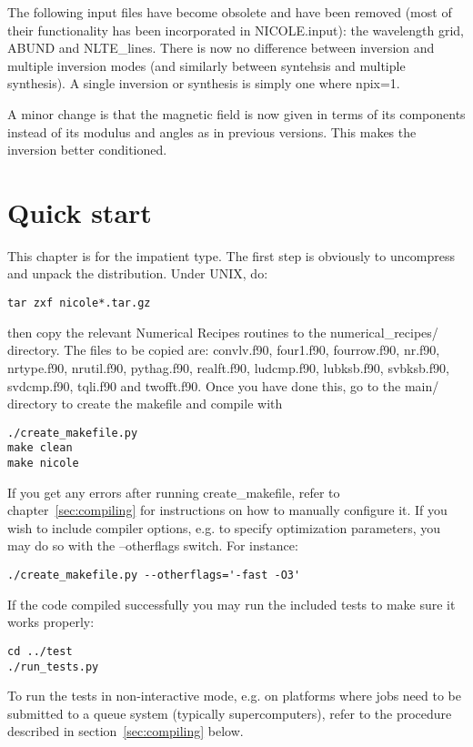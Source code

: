 The following input files have become obsolete and have been removed
(most of their functionality has been incorporated in NICOLE.input):
the wavelength grid, ABUND and NLTE\_lines. There is now no difference
between inversion and multiple inversion modes (and similarly between
syntehsis and multiple synthesis). A single inversion or synthesis is
simply one where npix=1.

A minor change is that the magnetic field is now given in terms of its
components instead of its modulus and angles as in previous
versions. This makes the inversion better conditioned. 


\chapter{Quick start}
\label{sec:start}

This chapter is for the impatient type. The first step is obviously to
uncompress and unpack the distribution. Under UNIX, do:

\begin{verbatim}
tar zxf nicole*.tar.gz
\end{verbatim}

then copy the relevant Numerical Recipes routines to the
numerical\_recipes/ directory. The files to be copied are: convlv.f90,
four1.f90, fourrow.f90, nr.f90, nrtype.f90, nrutil.f90, pythag.f90,
realft.f90, ludcmp.f90, lubksb.f90, svbksb.f90, svdcmp.f90, tqli.f90
and twofft.f90. Once you have done this, go to the main/ directory to create 
the makefile and compile with 
\begin{verbatim}
./create_makefile.py
make clean
make nicole
\end{verbatim}
If you get any errors after running create\_makefile, refer to
chapter~\ref{sec:compiling} for instructions on how to manually
configure it. If you wish to include compiler options, e.g. to specify
optimization parameters, you may do so with the --otherflags
switch. For instance:
\begin{verbatim}
./create_makefile.py --otherflags='-fast -O3'
\end{verbatim}
If the code compiled successfully you may run the
included tests to make sure it works properly:
\begin{verbatim}
cd ../test
./run_tests.py
\end{verbatim}
To run the tests in non-interactive mode, e.g. on platforms where jobs
need to be submitted to a queue system (typically supercomputers),
refer to the procedure described in section~\ref{sec:compiling} below.

